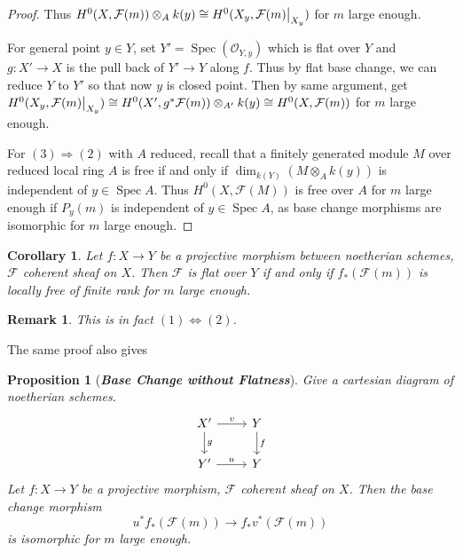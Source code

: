\documentclass{ctexart}
\newtheorem{remark}{Remark}[section]
\newtheorem{proposition}{Proposition}[section]
\newtheorem{corollary}{Corollary}[section]
\newcommand{\spec}{\operatorname{Spec}}
\begin{document}
\begin{proof}
    Thus $H^{0}(X, \mathcal{F}(m)) \otimes_{A} k(y) \cong H^{0}(X_{y}, \mathcal{F}(m)\big{|}_{X_{y}})$ for $m$ large enough.
    \par
    For general point $y\in Y$, set $Y' = \spec(\mathcal{O}_{Y, y})$ which is flat over $Y$ and $g: X' \longrightarrow X$ is the pull back of $Y' \longrightarrow Y$ along $f$.
    Thus by flat base change, we can reduce $Y$ to $Y'$ so that now $y$ is closed point.
    Then by same argument, get $H^{0}(X_{y}, \mathcal{F}(m)\big{|}_{X_{y}}) \cong H^{0}(X', g^{\ast}\mathcal{F}(m)) \otimes_{A'} k(y) \cong H^{0}(X, \mathcal{F}(m))$ for $m$ large enough. 
    \par
    For $(3) \Rightarrow (2)$ with $A$ reduced, recall that a finitely generated module $M$ over reduced local ring $A$ is free if and only if $\dim_{k(Y)}(M \otimes_{A} k(y))$ is independent of $y\in \spec A$.
    Thus $H^{0}(X, \mathcal{F}(M))$ is free over $A$ for $m$ large enough if $P_{y}(m)$ is independent of $y\in \spec A$, as base change morphisms are isomorphic for $m$ large enough.
\end{proof}
\begin{corollary}
    Let $f: X \longrightarrow Y$ be a projective morphism between noetherian schemes, $\mathcal{F}$ coherent sheaf on $X$.
    Then $\mathcal{F}$ is flat over $Y$ if and only if $f_{\ast}(\mathcal{F}(m))$ is locally free of finite rank for $m$ large enough.
    \label{Corollary 12.1}
\end{corollary}
\begin{remark}
    This is in fact $(1) \iff (2)$.
\end{remark}
The same proof also gives 
\begin{proposition}[\textbf{\emph{Base Change without Flatness}}]
    Give a cartesian diagram of noetherian schemes.
    \begin{equation*}
        \begin{tikzcd}
            X' \arrow[r, "v"] \arrow[d, "g"] &
            Y \arrow[d, "f"] \\
            Y' \arrow[r, "u"] &
            Y
        \end{tikzcd}
    \end{equation*}
    Let $f: X \longrightarrow Y$ be a projective morphism, $\mathcal{F}$ coherent sheaf on $X$.
    Then the base change morphism
    \begin{equation*}
        u^{\ast}f_{\ast}(\mathcal{F}(m)) \longrightarrow f_{\ast}v^{\ast}(\mathcal{F}(m))
    \end{equation*}
    is isomorphic for $m$ large enough.
    \label{Proposition 12.1}
\end{proposition}
\end{document}
